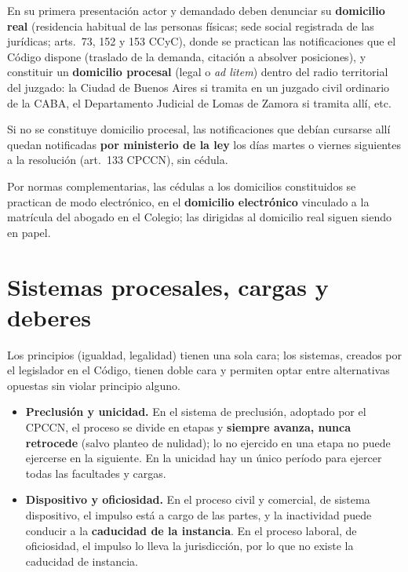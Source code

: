 \documentclass[12pt,oneside]{book}
\begin{document}
En su primera presentación actor y demandado deben denunciar su \textbf{domicilio real} (residencia habitual de las personas físicas; sede social registrada de las jurídicas; arts.~73, 152 y 153 CCyC), donde se practican las notificaciones que el Código dispone (traslado de la demanda, citación a absolver posiciones), y constituir un \textbf{domicilio procesal} (legal o \textit{ad litem}) dentro del radio territorial del juzgado: la Ciudad de Buenos Aires si tramita en un juzgado civil ordinario de la CABA, el Departamento Judicial de Lomas de Zamora si tramita allí, etc.

\begin{importante}
Si no se constituye domicilio procesal, las notificaciones que debían cursarse allí quedan notificadas \textbf{por ministerio de la ley} los días martes o viernes siguientes a la resolución (art.~133 CPCCN), sin cédula.
\end{importante}

Por normas complementarias, las cédulas a los domicilios constituidos se practican de modo electrónico, en el \textbf{domicilio electrónico} vinculado a la matrícula del abogado en el Colegio; las dirigidas al domicilio real siguen siendo en papel.

\section{Sistemas procesales, cargas y deberes}

Los principios (igualdad, legalidad) tienen una sola cara; los sistemas, creados por el legislador en el Código, tienen doble cara y permiten optar entre alternativas opuestas sin violar principio alguno.

\begin{itemize}
\item \textbf{Preclusión y unicidad.} En el sistema de preclusión, adoptado por el CPCCN, el proceso se divide en etapas y \textbf{siempre avanza, nunca retrocede} (salvo planteo de nulidad); lo no ejercido en una etapa no puede ejercerse en la siguiente. En la unicidad hay un único período para ejercer todas las facultades y cargas.
\item \textbf{Dispositivo y oficiosidad.} En el proceso civil y comercial, de sistema dispositivo, el impulso está a cargo de las partes, y la inactividad puede conducir a la \textbf{caducidad de la instancia}. En el proceso laboral, de oficiosidad, el impulso lo lleva la jurisdicción, por lo que no existe la caducidad de instancia.
\end{itemize}
\end{document}
